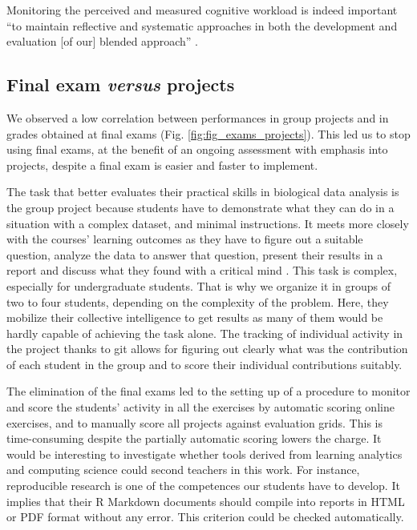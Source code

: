 \documentclass{aims}
\theoremstyle{definition}
\begin{document}
Monitoring the perceived and measured cognitive workload is indeed
important ``to maintain reflective and systematic approaches in both the
development and evaluation {[}of our{]} blended approach''
\cite{Spadafora2018}.

\hypertarget{final-exam-versus-projects-2}{%
\subsection{\texorpdfstring{Final exam \emph{versus}
projects}{Final exam versus projects}}\label{final-exam-versus-projects-2}}

We observed a low correlation between performances in group projects and
in grades obtained at final exams (Fig. \ref {fig:fig_exams_projects}).
This led us to stop using final exams, at the benefit of an ongoing
assessment with emphasis into projects, despite a final exam is easier
and faster to implement.

The task that better evaluates their practical skills in biological data
analysis is the group project because students have to demonstrate what
they can do in a situation with a complex dataset, and minimal
instructions. It meets more closely with the courses' learning outcomes
as they have to figure out a suitable question, analyze the data to
answer that question, present their results in a report and discuss what
they found with a critical mind \cite{Auker2020}. This task is complex,
especially for undergraduate students. That is why we organize it in
groups of two to four students, depending on the complexity of the
problem. Here, they mobilize their collective intelligence to get
results as many of them would be hardly capable of achieving the task
alone. The tracking of individual activity in the project thanks to git
allows for figuring out clearly what was the contribution of each
student in the group and to score their individual contributions
suitably.

The elimination of the final exams led to the setting up of a procedure
to monitor and score the students' activity in all the exercises by
automatic scoring online exercises, and to manually score all projects
against evaluation grids. This is time-consuming despite the partially
automatic scoring lowers the charge. It would be interesting to
investigate whether tools derived from learning analytics and computing
science could second teachers in this work. For instance, reproducible
research is one of the competences our students have to develop. It
implies that their R Markdown documents should compile into reports in
HTML or PDF format without any error. This criterion could be checked
automatically.
\end{document}

